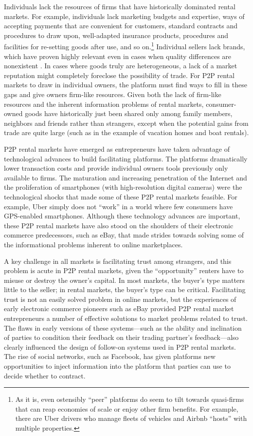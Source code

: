 \documentclass[12pt]{article}
\begin{document}
Individuals lack the resources of firms that have historically dominated rental markets. 
For example, individuals lack marketing budgets and expertise, ways of accepting payments that are convenient for customers, standard contracts and procedures to draw upon, well-adapted insurance products, procedures and facilities for re-setting goods after use, and so on.\footnote{
  As it is, even ostensibly ``peer'' platforms do seem to tilt towards quasi-firms that can reap economies of scale or enjoy other firm benefits.
  For example, there are Uber drivers who manage fleets of vehicles and Airbnb ``hosts'' with multiple properties. 
}
Individual sellers lack brands, which have proven highly relevant even in cases when quality differences are nonexistent \citep{bronnenberg2014pharmacists}. 
In cases where goods truly are heterogeneous, a lack of a market reputation might completely foreclose the possibility of trade.  
For P2P rental markets to draw in individual owners, the platform must find ways to fill in these gaps and give owners firm-like resources. 
Given both the lack of firm-like resources and the inherent information problems of rental markets, consumer-owned goods have historically just been shared only among family members, neighbors and friends rather than strangers, except when the potential gains from trade are quite large (such as in the example of vacation homes and boat rentals). 

P2P rental markets have emerged as entrepreneurs have taken advantage of technological advances to build facilitating platforms. 
The platforms dramatically lower transaction costs and provide individual owners tools previously only available to firms. 
The maturation and increasing penetration of the Internet and the proliferation of smartphones (with high-resolution digital cameras) were the technological shocks that made some of these P2P rental markets feasible.
For example, Uber simply does not ``work'' in a world where few consumers have GPS-enabled smartphones. 
Although these technology advances are important, these P2P rental markets have also stood on the shoulders of their electronic commerce predecessors, such as eBay, that made strides towards solving some of the informational problems inherent to online marketplaces. 

A key challenge in all markets is facilitating trust among strangers, and this problem is acute in P2P rental markets, given the ``opportunity'' renters have to misuse or destroy the owner's capital.
In most markets, the buyer's type matters little to the seller; in rental markets, the buyer's type can be critical. 
Facilitating trust is not an easily solved problem in online markets, but the experiences of early electronic commerce pioneers such as eBay provided P2P rental market entrepreneurs a number of effective solutions to market problems related to trust. 
The flaws in early versions of these systems---such as the ability and inclination of parties to condition their feedback on their trading partner's feedback---also clearly influenced the design of follow-on systems used in P2P rental markets. 
The rise of social networks, such as Facebook, has given platforms new opportunities to inject information into the platform that parties can use to decide whether to contract. 
\end{document}
